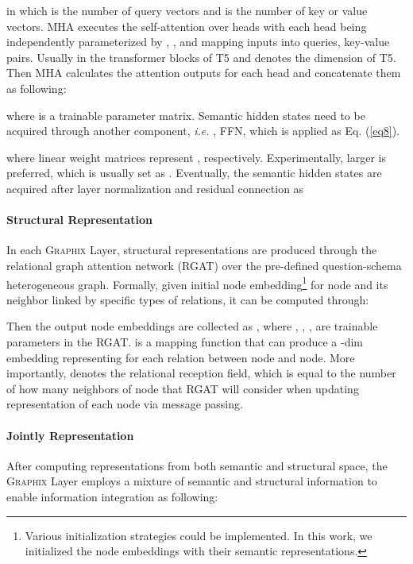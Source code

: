 \documentclass[letterpaper]{article} \usepackage{aaai23}  \usepackage{times}  \usepackage{helvet}  \usepackage{courier}  \usepackage[hyphens]{url}  \usepackage{graphicx} \usepackage{amsmath}
\newcommand{\graphix}{\textsc{Graphix}\xspace}
\def\ie{\emph{i.e. }}
\begin{document}
in which  is the number of query vectors and  is the number of key or value vectors. MHA executes the self-attention over  heads with each head  being independently parameterized by , ,  and mapping inputs into queries, key-value pairs. Usually  in the transformer blocks of T5 and  denotes the dimension of T5. Then MHA calculates the attention outputs for each head and concatenate them as following:

where  is a trainable parameter matrix.
Semantic hidden states need to be acquired through another component, \ie, FFN, which is applied as Eq. (\ref{eq8}).

where linear weight matrices represent ,  respectively. Experimentally, larger  is preferred, which is usually set as . Eventually, the semantic hidden states are acquired after layer normalization and residual connection as



\paragraph{Structural Representation}
In each \graphix Layer, structural representations are produced through the relational graph attention network (RGAT) \citep{rgat} over the pre-defined question-schema heterogeneous graph. Formally, given initial node embedding\footnote{\small Various initialization strategies could be implemented. In this work, we initialized the node embeddings with their semantic representations.}   for  node and its  neighbor  linked by specific types of relations, it can be computed through:





Then the output node embeddings are collected as , where , , ,   are trainable parameters in the RGAT.  is a mapping function that can produce a -dim embedding representing for each relation between  node and  node. More importantly,  denotes the relational reception field, which is equal to the number of how many neighbors of  node that RGAT will consider when updating representation of each node via message passing.




\paragraph{Jointly Representation}
After computing representations from both semantic and structural space, the  \graphix Layer employs a mixture of semantic and structural information to enable information integration as following:
\end{document}
